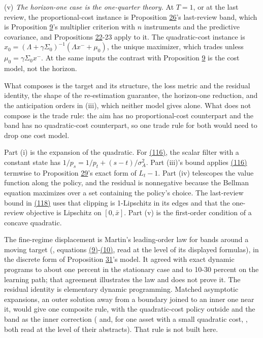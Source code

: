 \documentclass[11pt]{article}
\begin{document}
(v) \emph{The horizon-one case is the one-quarter theory.} At \(T=1\), or at
the last review, the proportional-cost instance is Proposition \hyperref[res:Proposition-26]{26}'s
last-review band, which is Proposition \hyperref[res:Proposition-9]{9}'s multiplier criterion with
\(n\) instruments and the predictive covariance, and Propositions \hyperref[res:Proposition-22]{22}-23
apply to it. The quadratic-cost instance is
\(x_0=(\Lambda+\gamma\Sigma_0)^{-1}(\Lambda x^-+\mu_0)\), the unique maximizer, which trades
unless \(\mu_0=\gamma\Sigma_0x^-\). At the same inputs the contrast with
Proposition \hyperref[res:Proposition-9]{9} is the cost model, not the horizon.

What composes is the target and its structure, the loss metric and
the residual identity, the shape of the re-estimation guarantee, the
horizon-one reduction, and the anticipation orders in (iii), which
neither model gives alone. What does not compose is the trade rule:
the aim has no proportional-cost counterpart and the band has no
quadratic-cost counterpart, so one trade rule for both would need to
drop one cost model.

Part (i) is the expansion of the quadratic. For \hyperref[eq:116]{(116)}, the scalar
filter with a constant state has \(1/p_s=1/p_t+(s-t)/\sigma_A^2\). Part (iii)'s
bound applies \hyperref[eq:116]{(116)} termwise to Proposition \hyperref[res:Proposition-29]{29}'s exact form of \(L_t-1\).
Part (iv) telescopes the value function along the policy, and the
residual is nonnegative because the Bellman equation maximizes over a
set containing the policy's choice. The last-review bound in \hyperref[eq:118]{(118)}
uses that clipping is 1-Lipschitz in its edges and that the one-review
objective is Lipschitz on \([0,\bar x]\). Part (v) is the first-order
condition of a concave quadratic.

The fine-regime displacement is Martin's leading-order law for bands
around a moving target (\cite{martin2012optimal}, equations \hyperref[eq:9]{(9)}-\hyperref[eq:10]{(10)}, read
at the level of its displayed formulas), in the discrete form of
Proposition \hyperref[res:Proposition-31]{31}'s model. It agreed with exact dynamic programs to about
one percent in the stationary case and to 10-30 percent on the
learning path; that agreement illustrates the law and does not prove
it. The residual identity is
elementary dynamic programming. Matched asymptotic expansions, an
outer solution away from a boundary joined to an inner one near it,
would give one composite rule, with the quadratic-cost policy outside
and the band as the inner correction (\cite{howison2005matched} and, for one
asset with a small quadratic cost, \cite{chandra2019singular}, both read at
the level of their abstracts). That rule is not built here.
\end{document}
